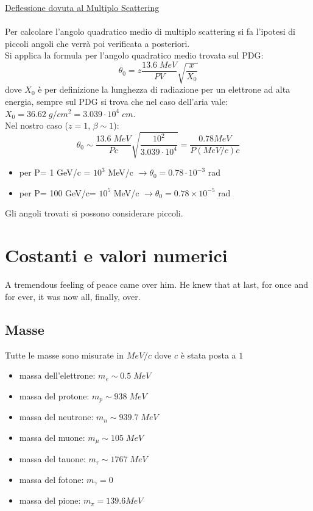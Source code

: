 \documentclass[twoside]{article}
\begin{document}
\underline{Deflessione dovuta al Multiplo Scattering}\\
\\
Per calcolare l'angolo quadratico medio di multiplo scattering si fa l'ipotesi di piccoli angoli che verrà poi verificata a posteriori.\\

Si applica la formula per l'angolo quadratico medio trovata sul PDG:
\begin{equation}
 \theta_0= z\frac{13.6 \;MeV}{PV}\sqrt{\frac{x}{X_0}}
\end{equation}
dove $X_0$ è per definizione la lunghezza di radiazione per un elettrone ad alta energia, sempre sul PDG si trova che nel caso dell'aria vale: $X_0=36.62\;g/cm^2 =3.039 \cdot 10^4 \;cm$. \\
Nel nostro caso ($z=1$, $\beta \sim 1$): 
\begin{equation}
    \theta_0\sim \frac{13.6 \;MeV}{P c}\sqrt{\frac{10^2}{3.039 \cdot 10^4}}=\frac{0.78 MeV}{P(MeV/c) c} 
\end{equation}

\begin{itemize}
    \item per P= 1 GeV/c = $10^{3}$ MeV/c $\rightarrow \theta_0= 0.78 \cdot 10^{-3}$ rad
    \item per P= 100 GeV/c= $10^{5}$ MeV/c $\rightarrow \theta_0= 0.78 \times 10^{-5}$ rad
\end{itemize}
Gli angoli trovati si possono considerare piccoli.

\newpage
\section{Costanti e valori numerici}
\epigraph{A tremendous feeling of peace came over him. He knew that at last, for once and for ever, it was now all, finally, over.}{}
\subsection{Masse}
Tutte le masse sono misurate in $MeV/c$ dove $c$ è stata posta a $1$
\begin{itemize}
    \item massa dell'elettrone: $m_e \sim 0.5 \; MeV$
    \item massa del protone: $m_p \sim 938 \; MeV$
    \item massa del neutrone: $m_n \sim 939.7 \; MeV$
    \item massa del muone: $m_\mu \sim 105 \; MeV$
    \item massa del tauone: $m_\tau \sim 1767 \; MeV$
    \item massa del fotone: $m_\gamma = 0$
    \item massa del pione: $m_\pi=139.6 MeV$
\end{itemize}
\end{document}
